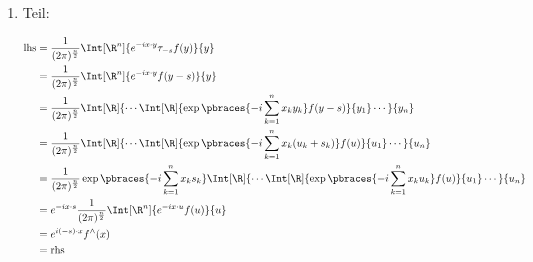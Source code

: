 \begin{solution}

\phantom{}

\begin{enumerate}[label = \arabic*.]

    \item Teil:
    
    \begin{align*}
        \mathrm{lhs}
        & =
        \frac{1}{(2 \pi)^\frac{n}{2}}
        \Int[\R^n]
        {
            e^{-i x \cdot y}
            \tau_{-s} f(y)
        }{y} \\
        & =
        \frac{1}{(2 \pi)^\frac{n}{2}}
        \Int[\R^n]
        {
            e^{-i x \cdot y}
            f(y - s)
        }{y} \\
        & =
        \frac{1}{(2 \pi)^\frac{n}{2}}
        \Int[\R]
        {
            \cdots
            \Int[\R]
            {
                \exp
                \pbraces
                {
                    -i
                    \sum_{k=1}^n
                    x_k y_k
                }
                f(y - s)
            }{y_1}
            \cdots
        }{y_n} \\
        & =
        \frac{1}{(2 \pi)^\frac{n}{2}}
        \Int[\R]
        {
            \cdots
            \Int[\R]
            {
                \exp
                \pbraces
                {
                    -i
                    \sum_{k=1}^n
                    x_k (u_k + s_k)
                }
                f(u)
            }{u_1}
            \cdots
        }{u_n} \\
        & =
        \frac{1}{(2 \pi)^\frac{n}{2}}
        \exp
        \pbraces
        {
            -i
            \sum_{k=1}^n
            x_k s_k
        }
        \Int[\R]
        {
            \cdots
            \Int[\R]
            {
                \exp
                \pbraces
                {
                    -i
                    \sum_{k=1}^n
                    x_k u_k
                }
                f(u)
            }{u_1}
            \cdots
        }{u_n} \\
        & =
        e^{-i x \cdot s}
        \frac{1}{(2 \pi)^\frac{n}{2}}
        \Int[\R^n]
        {
            e^{-i x \cdot u}
            f(u)
        }{u} \\
        & =
        e^{i (-s) \cdot x}
        f^\wedge(x) \\
        & =
        \mathrm{rhs}
    \end{align*}


\end{enumerate}
\end{solution}
